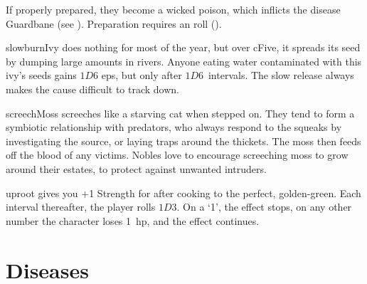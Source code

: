 \begin{multicols}{2}
{  If properly prepared, they become a wicked poison, which inflicts the disease Guardbane (see ).
  Preparation requires an  roll (\tn[12]).
    }

%
  {slowburnIvy}%
  {does nothing for most of the year, but over \gls{cFive}, it spreads its seed by dumping large amounts in rivers.
  Anyone eating water contaminated with this ivy's seeds gains $1D6$ \glspl{ep}, but only after $1D6$~\glspl{interval}.
  The slow release always makes the cause difficult to track down.
    }

%
  {screechMoss}%
  {screeches like a starving cat when stepped on.
  They tend to form a symbiotic relationship with predators, who always respond to the squeaks by investigating the source, or laying traps around the thickets.
  The moss then feeds off the blood of any victims.
  Nobles love to encourage screeching moss to grow around their estates, to protect against unwanted intruders.}

%
  {uproot}%
  {gives you +1 Strength for  after cooking to the perfect, golden-green.
  Each \gls{interval} thereafter, the player rolls $1D3$.
  On a `1', the effect stops, on any other number the character loses 1~\gls{hp}, and the effect continues.}

\end{multicols}

\section[Diseases]{Diseases~}
\label{diseases}
\setcounter{encnum}{0}

